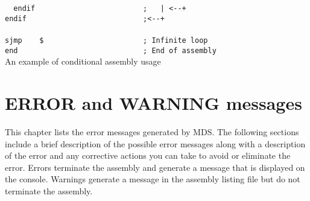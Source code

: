 {\begin{code}[h!]
                        \verb'  '{\color{highlight_directive}\verb'endif'}\verb'                         '{\color{highlight_comment}\verb';   | <--+'}\\
                        {\color{highlight_directive}\verb'endif'}\verb'                           '{\color{highlight_comment}\verb';<--+'}\\
                        \verb''\\
                        {\color{highlight_instruction}\verb'sjmp'}\verb'    '{\color{highlight_constant}\verb'$'}\verb'                       '{\color{highlight_comment}\verb'; Infinite loop'}\\
                        {\color{highlight_directive}\verb'end'}\verb'                             '{\color{highlight_comment}\verb'; End of assembly'}\\
                        \caption{An example of conditional assembly usage}
                \end{code}

                \clearpage
        \section{ERROR and WARNING messages}
        This chapter lists the error messages generated by MDS. The following sections
        include a brief description of the possible error messages along with a
        description of the error and any corrective actions you can take to avoid or
        eliminate the error. Errors terminate the assembly and generate a message that is displayed on
        the console. Warnings generate a message in the assembly listing file but do not terminate the assembly.
}
